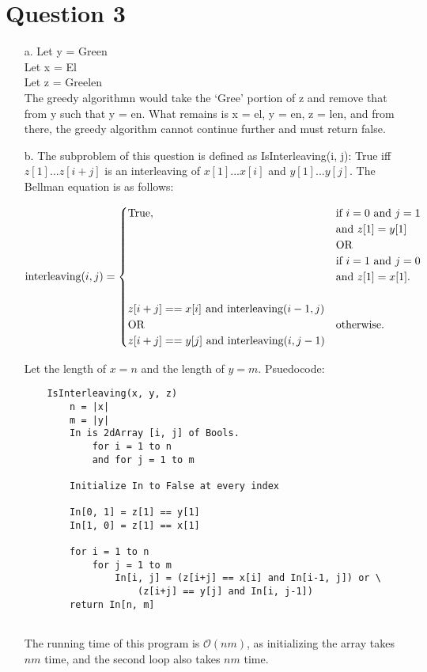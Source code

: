 \documentclass[12pt]{article}
\begin{document}
\section*{Question 3} 
\begin{enumerate}
    \item[a.] Let y = Green\\
              Let x = El\\
              Let z = Greelen\\
 
              The greedy algorithmn would take the `Gree' portion of z and remove that from y such that y = en.
              What remains is x = el, y = en, z = len, and from there, the greedy algorithm cannot continue further
              and must return false.

    \item[b.] The subproblem of this question is defined as IsInterleaving(i, j): True iff $z[1] ... z[i+j]$ is an interleaving of $x[1] ... x[i]$ and $y[1] ... y[j]$. The Bellman equation is as follows:
    
    \begin{equation*}
        \text{interleaving}(i,j)=\begin{cases}
    \text{True}, & \text{if $i = 0$ and $j = 1$} \\ & \text{and $z[1] = y[1]$} \\ & \text{OR} \\ & \text{if $i = 1$ and $j = 0$} \\ & \text{and $z[1] = x[1]$}.\\ \\
    z[i+j] == x[i] \newline \text{ and interleaving}(i-1, j) \\ \text{OR} & \text{otherwise}. \\ z[i+j] == y[j] \text{ and interleaving}(i, j-1)
    \end{cases}
    \end{equation*}
    
    Let the length of $x = n$ and the length of $y = m$. Psuedocode: 
    \begin{verbatim}
    IsInterleaving(x, y, z)
        n = |x|
        m = |y|
        In is 2dArray [i, j] of Bools.
            for i = 1 to n
            and for j = 1 to m
        
        Initialize In to False at every index
        
        In[0, 1] = z[1] == y[1]
        In[1, 0] = z[1] == x[1]
        
        for i = 1 to n
            for j = 1 to m
                In[i, j] = (z[i+j] == x[i] and In[i-1, j]) or \
                    (z[i+j] == y[j] and In[i, j-1])
        return In[n, m]
            
    \end{verbatim}
    The running time of this program is $\mathcal{O}(nm)$, as initializing the array takes $nm$ time, and the second loop also takes $nm$ time.

\end{enumerate}
\end{document}
